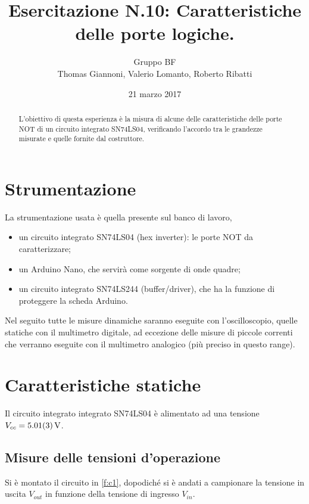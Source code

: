 \documentclass[a4paper,11pt]{article}
\author{Gruppo BF \\ Thomas Giannoni, Valerio Lomanto, Roberto Ribatti}
\title{Esercitazione N.10: Caratteristiche delle porte logiche.}
\date{21 marzo 2017}
\begin{document}
\maketitle
\begin{abstract}
	L'obiettivo di questa esperienza è la misura di alcune delle caratteristiche delle porte NOT di un circuito integrato SN74LS04, verificando l'accordo tra le grandezze misurate e quelle fornite dal costruttore.
\end{abstract}

\section{Strumentazione}
La strumentazione usata è quella presente sul banco di lavoro,
		\begin{itemize}
			\item un circuito integrato SN74LS04 (hex inverter): le porte NOT da caratterizzare;
			\item un Arduino Nano, che servirà come sorgente di onde quadre;
			\item un circuito integrato SN74LS244 (buffer/driver), che ha la funzione di proteggere la scheda Arduino.
		\end{itemize}
Nel seguito tutte le misure dinamiche saranno eseguite con l'oscilloscopio, quelle statiche con il multimetro digitale, ad eccezione delle misure di piccole correnti che verranno eseguite con il multimetro analogico (più preciso in questo range).

\section{Caratteristiche statiche}
Il circuito integrato integrato SN74LS04 è alimentato ad una tensione $V_{cc} =\SI{5.01 \pm 0.03}{\volt}$.

\subsection{Misure delle tensioni d'operazione}
Si è montato il circuito in \figurename{ \ref{f:c1}}, dopodiché si è andati a  campionare la tensione in uscita $V_{out}$ in funzione della tensione di ingresso $V_{in}$.
\end{document}
